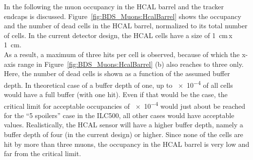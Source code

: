 In the following the muon occupancy in the HCAL barrel and the tracker endcaps is discussed.
Figure~\ref{fig:BDS_Muons:HcalBarrel} shows the occupancy and the number of dead cells in the HCAL barrel, normalized to its total number of cells.
In the current detector design, the HCAL cells have a size of \SI{1}{\centi\meter}\,x\,\SI{1}{\centi\meter}.
\\As a result, a maximum of three hits per cell is observed, because of which the x-axis range in Figure~\ref{fig:BDS_Muons:HcalBarrel} (b) also reaches to three only.
Here, the number of dead cells is shown as a function of the assumed buffer depth.
In theoretical case of a buffer depth of one, up to \num{e-4} of all cells would have a full buffer (with one hit).
Even if that would be the case, the critical limit for acceptable occupancies of \num{e-4} would just about be reached for the ``5 spoilers'' case in the ILC500, all other cases would have acceptable values.
Realistically, the HCAL sensor will have a higher buffer depth, namely a buffer depth of four (in the current design) or higher.
Since none of the cells are hit by more than three muons, the occupancy in the HCAL barrel is very low and far from the critical limit.
